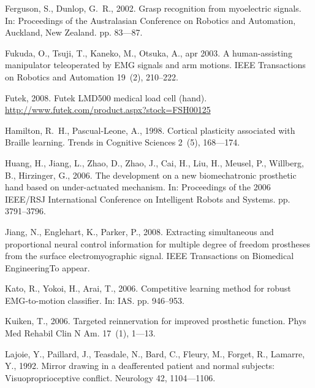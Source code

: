 \documentclass[review,authoryear]{elsarticle}
\begin{document}
\begin{thebibliography}{43}
Ferguson, S., Dunlop, G.~R., 2002. Grasp recognition from myoelectric signals.
  In: Proceedings of the Australasian Conference on Robotics and Automation,
  Auckland, New Zealand. pp. 83---87.

Fukuda, O., Tsuji, T., Kaneko, M., Otsuka, A., apr 2003. A human-assisting
  manipulator teleoperated by {EMG} signals and arm motions. IEEE Transactions
  on Robotics and Automation 19~(2), 210--222.

Futek, 2008. Futek {LMD500} medical load cell (hand).
\newline\urlprefix\url{http://www.futek.com/product.aspx?stock=FSH00125}

Hamilton, R.~H., Pascual-Leone, A., 1998. Cortical plasticity associated with
  {Braille} learning. Trends in Cognitive Sciences 2~(5), 168---174.

Huang, H., Jiang, L., Zhao, D., Zhao, J., Cai, H., Liu, H., Meusel, P.,
  Willberg, B., Hirzinger, G., 2006. The development on a new biomechatronic
  prosthetic hand based on under-actuated mechanism. In: Proceedings of the
  2006 IEEE/RSJ International Conference on Intelligent Robots and Systems. pp.
  3791--3796.

Jiang, N., Englehart, K., Parker, P., 2008. Extracting simultaneous and
  proportional neural control information for multiple degree of freedom
  prostheses from the surface electromyographic signal. IEEE Transactions on
  Biomedical EngineeringTo appear.

Kato, R., Yokoi, H., Arai, T., 2006. Competitive learning method for robust
  {EMG}-to-motion classifier. In: IAS. pp. 946--953.

Kuiken, T., 2006. Targeted reinnervation for improved prosthetic function. Phys
  Med Rehabil Clin N Am. 17~(1), 1---13.

Lajoie, Y., Paillard, J., Teasdale, N., Bard, C., Fleury, M., Forget, R.,
  Lamarre, Y., 1992. Mirror drawing in a deafferented patient and normal
  subjects: Visuoproprioceptive conflict. Neurology 42, 1104---1106.


\end{thebibliography}
\end{document}
